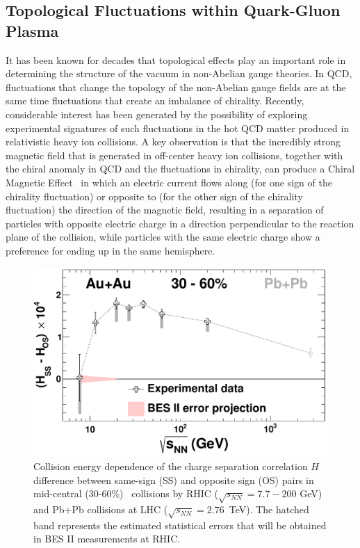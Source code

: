 \subsection{Topological Fluctuations within Quark-Gluon Plasma}
\label{Sec:Exotica}

It has been known for decades that topological effects play an
important role in determining the structure of the vacuum in
non-Abelian gauge theories\cite{Belavin:1975fg}.  In QCD, fluctuations
that change the topology of the non-Abelian gauge fields are at the
same time fluctuations that create an imbalance of chirality.
Recently, considerable interest has been generated by the possibility
of exploring experimental signatures of such fluctuations in the hot
QCD matter produced in relativistic heavy ion collisions.  A key
observation is that the incredibly strong magnetic field that is
generated in off-center heavy ion collisions, together with the chiral
anomaly in QCD and the fluctuations in chirality, can produce a Chiral
Magnetic
Effect~\cite{Kharzeev:2007tn,Kharzeev:2007jp,Fukushima:2008xe,Hirono:2014oda}
in which an electric current flows along (for one sign of the
chirality fluctuation) or opposite to (for the other sign of the
chirality fluctuation) the direction of the magnetic field, resulting
in a separation of particles with opposite electric charge in a
direction perpendicular to the reaction plane of the collision, while
particles with the same electric charge show a preference for ending
up in the same hemisphere.
\begin{figure}[!htp]
\includegraphics[width=\textwidth]{fig/CMEfromBES.pdf}
\caption[Charge separation results from STAR and ALICE]{Collision energy dependence of the charge separation
  correlation $H$ difference between same-sign (SS) and opposite sign
  (OS) pairs in mid-central (30-60\%) \AuAu\ collisions by RHIC\cite{Adamczyk:2014mzf}
  ($\sqrt{s_{NN}}= 7.7 - 200$ GeV) and Pb+Pb collisions at LHC\cite{Abelev:2012pa}
  ($\sqrt{s_{NN}}= 2.76$~TeV). The hatched band represents the
  estimated statistical errors that will be obtained in BES II
  measurements at RHIC.}
\label{Fig:CME}
\end{figure}


